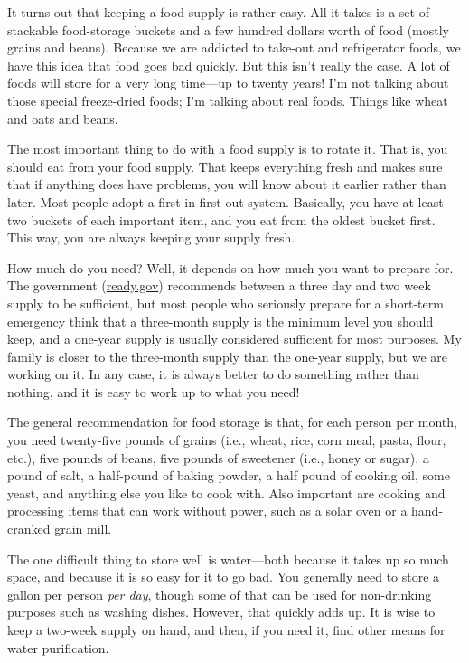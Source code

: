 It turns out that keeping a food supply is rather easy. All it takes is
a set of stackable food-storage buckets and a few hundred dollars worth
of food (mostly grains and beans). Because we are addicted to take-out
and refrigerator foods, we have this idea that food goes bad quickly.
But this isn’t really the case. A lot of foods will store for a very
long time—up to twenty years!  I’m not talking about those special
freeze-dried foods; I’m talking about real foods. Things like wheat and
oats and beans.

The most important thing to do with a food supply is to rotate it. That
is, you should eat from your food supply. That keeps everything fresh
and makes sure that if anything does have problems, you will know about
it earlier rather than later. Most people adopt a first-in-first-out
system. Basically, you have at least two buckets of each important
item, and you eat from the oldest bucket first. This way, you are
always keeping your supply fresh.

How much do you need?  Well, it depends on how much you want to prepare
for. The government (\url{ready.gov}) recommends between a three day and two week supply to be
sufficient, but most people who seriously prepare for a short-term
emergency think that a three-month supply is the minimum level you
should keep, and a one-year supply is usually considered sufficient for
most purposes. My family is closer to the three-month supply than the
one-year supply, but we are working on it. In any case, it is always
better to do something rather than nothing, and it is easy to work up
to what you need!  

The general recommendation for food storage is that, for each person
per month, you need
twenty-five pounds of grains (i.e., wheat, rice, corn meal, pasta,
flour, etc.), five pounds of beans, five pounds of sweetener (i.e.,
honey or sugar), a pound of salt, a half-pound of baking powder, a half
pound of cooking oil, some yeast, and anything else you like to cook
with. Also important are cooking and processing items that can work
without power, such as a solar oven or a hand-cranked grain mill.

The one difficult thing to store well is water—both because it takes up
so much space, and because it is so easy for it to go bad. You
generally need to store a gallon per person \textit{per day}, though
some of that can be used for non-drinking purposes such as washing
dishes. However, that quickly adds up. It is wise to keep a two-week
supply on hand, and then, if you need it, find other means for water
purification. 

